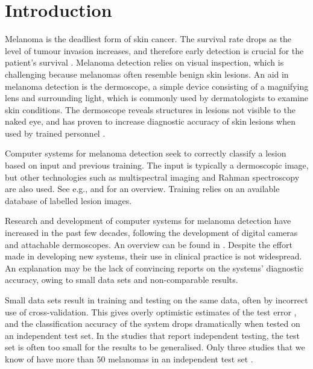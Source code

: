 \documentclass[a4paper,12pt]{article}
\begin{document}
\newpage

\section{Introduction}

Melanoma is the deadliest form of skin cancer. The survival rate drops as the level of tumour invasion increases, and therefore early detection is crucial for the patient's survival \citep{AmericanCancerSociety2016Cancer, CancerRegistryofNorway2016Cancer}. Melanoma detection relies on visual inspection, which is challenging because melanomas often resemble benign skin lesions. 
An aid in melanoma detection is the dermoscope, a simple device consisting of a magnifying lens and surrounding light, which is commonly used by dermatologists to examine skin conditions. 
The dermoscope reveals structures in lesions not visible to the naked eye, and has proven to increase diagnostic accuracy of skin lesions when used by trained personnel \citep{Kittler2002Diagnostic}.

Computer systems for melanoma detection seek to correctly classify a lesion based on input and previous training. 
The input is typically a dermoscopic image, but other technologies such as multispectral imaging and Rahman spectroscopy are also used. 
See e.g., \cite{Fink2016Noninvasive} and \cite{Masood2013Computer} for an overview. 
Training relies on an available database of labelled lesion images. 

Research and development of computer systems for melanoma detection have increased in the past few decades, following the development of digital cameras and attachable dermoscopes. 
An overview can be found in \cite{Korotkov2012Computerized}. 
Despite the effort made in developing new systems, their use in clinical practice is not widespread. 
An explanation may be the lack of convincing reports on the systems' diagnostic accuracy, owing to small data sets and non-comparable results. 

Small data sets result in training and testing on the same data, often by incorrect use of cross-validation. 
This gives overly optimistic estimates of the test error \citep{Smialowski2010Pitfalls,Hastie2009Elements}, and the classification accuracy of the system drops dramatically when tested on an independent test set. 
In the studies that report independent testing, the test set is often too small for the results to be generalised. 
Only three studies that we know of have more than $50$ melanomas in an independent test set \citep{Monheit2011Performance, Malvehy2014Clinical, Esteva2017Dermatologistlevel}. 
\end{document}
